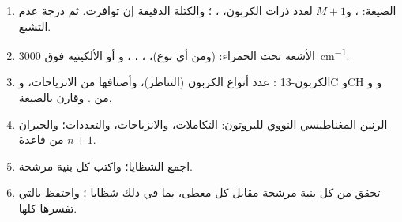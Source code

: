 \begin{method}[حل مجهول]\label{met:b2:structure-determination:solve}
\begin{enumerate}
  \item الصيغة: ، و$M+1$ لعدد ذرات الكربون، ، ؛ 
        والكتلة الدقيقة إن توافرت. ثم درجة عدم التشبع.
  \item الأشعة تحت الحمراء:  (ومن أي نوع)، ، ، ، و  أو الألكينية
        فوق \qty{3000}{cm^{-1}}.
  \item الكربون-13 : عدد أنواع الكربون (التناظر)، وأصنافها من الانزياحات، 
        وC وCH و و من . وقارن بالصيغة.
  \item الرنين المغناطيسي النووي للبروتون: التكاملات، والانزياحات، والتعددات؛ والجيران من قاعدة $n + 1$.
  \item اجمع الشظايا؛ واكتب كل بنية مرشحة.
  \item تحقق من كل بنية مرشحة مقابل كل معطى، بما في ذلك شظايا ؛ واحتفظ بالتي
        تفسرها كلها.
\end{enumerate}
\end{method}

